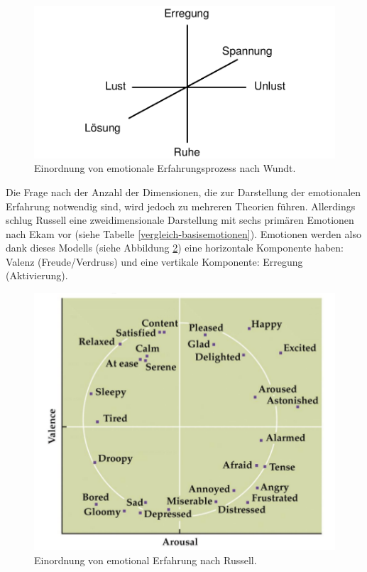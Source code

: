 \begin{figure}[h]
\includegraphics[width=\textwidth]{Images/wundt.png} 
\vspace{-0.3cm} 
\caption[Einordnung von emotionale Erfahrungsprozess nach Wundt.]{ Einordnung von emotionale Erfahrungsprozess nach Wundt\cite{basic_emotions_theories}. }
\label{wundt} 
\end{figure}


Die Frage nach der Anzahl der Dimensionen, die zur Darstellung der emotionalen Erfahrung notwendig sind, wird jedoch zu mehreren Theorien führen. 
Allerdings schlug Russell\cite{basic_emotions_theories} eine zweidimensionale Darstellung mit sechs primären Emotionen nach Ekam vor (siehe Tabelle \ref{vergleich-basisemotionen}). 
Emotionen werden also dank dieses Modells (siehe Abbildung \ref{russell}) eine horizontale Komponente haben: Valenz (Freude/Verdruss) und eine vertikale Komponente: Erregung (Aktivierung). 


\begin{figure}[h] \centering
\includegraphics[width=12cm]{Images/russell.png} 
\vspace{-0.3cm} 
\caption[Einordnung von emotional Erfahrung nach Russell.]{ Einordnung von emotional Erfahrung nach Russell\cite{basic_emotions_theories}. }
\label{russell} 
\end{figure}


